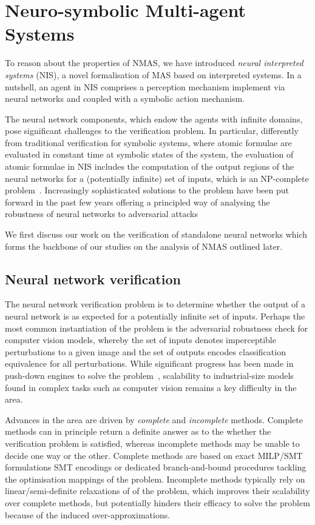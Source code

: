 \documentclass{article}
\begin{document}
\section{Neuro-symbolic Multi-agent Systems}



To reason about the properties of NMAS, we have
introduced {\em neural interpreted systems} (NIS), a novel formalisation of MAS
based on interpreted systems. In a nutshell, an agent in NIS comprises a
perception mechanism implement via neural networks and coupled with a symbolic
action mechanism.  

The neural network components, which endow the agents with infinite domains,
pose significant  challenges to the verification problem.  In particular,
differently from traditional verification for symbolic systems, where atomic
formulae are evaluated in constant time at symbolic states of the system, the
evaluation of atomic formulae in NIS includes the computation of the output
regions of the neural networks  for a (potentially infinite) set of inputs,
which is an NP-complete problem~\cite{Katz+17}. Increasingly sophisticated
solutions to the problem have been put forward in the past few years  offering
a principled way of analysing the robustness of neural networks to adversarial
attacks~\cite{Singh+19,KouvarosLomuscio21,Wang+21}

We first discuss our work on the verification of standalone neural networks
which forms the backbone of our studies on the analysis of  NMAS outlined later.


\subsection{Neural network verification} The neural network verification problem is to
determine whether the output of a neural network is as expected for a
potentially infinite set of inputs. Perhaps the most common instantiation of the
problem is the adversarial robustness check for computer vision models, whereby
the set of inputs denotes imperceptible perturbations to a given image and the
set of outputs encodes classification equivalence for all perturbations. While
significant progress has been made in push-down engines to solve the
problem~\cite{Brix+23}, scalability to industrial-size models found in complex
tasks such as computer vision remains a key difficulty in the area.  

Advances in the area are driven by {\em complete} and {\em incomplete} methods.
Complete methods can in principle return a definite answer as to the whether the
verification problem is satisfied, whereas incomplete methods may be unable to
decide one way or the other. Complete methods are based on exact MILP/SMT
formulations SMT encodings or dedicated branch-and-bound procedures tackling the
optimisation mappings of the problem.  Incomplete methods typically rely on
linear/semi-definite relaxations of of the problem, which improves their
scalability over complete methods, but potentially hinders their efficacy to
solve the problem because of the induced over-approximations.
\end{document}

